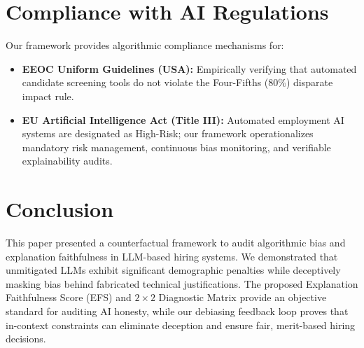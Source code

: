 \documentclass[conference]{IEEEtran}
\begin{document}
\section{Compliance with AI Regulations}
Our framework provides algorithmic compliance mechanisms for:
\begin{itemize}
    \item \textbf{EEOC Uniform Guidelines (USA):} Empirically verifying that automated candidate screening tools do not violate the Four-Fifths ($80\%$) disparate impact rule.
    \item \textbf{EU Artificial Intelligence Act (Title III):} Automated employment AI systems are designated as High-Risk; our framework operationalizes mandatory risk management, continuous bias monitoring, and verifiable explainability audits.
\end{itemize}

\section{Conclusion}
This paper presented a counterfactual framework to audit algorithmic bias and explanation faithfulness in LLM-based hiring systems. We demonstrated that unmitigated LLMs exhibit significant demographic penalties while deceptively masking bias behind fabricated technical justifications. The proposed Explanation Faithfulness Score (EFS) and $2 \times 2$ Diagnostic Matrix provide an objective standard for auditing AI honesty, while our debiasing feedback loop proves that in-context constraints can eliminate deception and ensure fair, merit-based hiring decisions.
\end{document}
